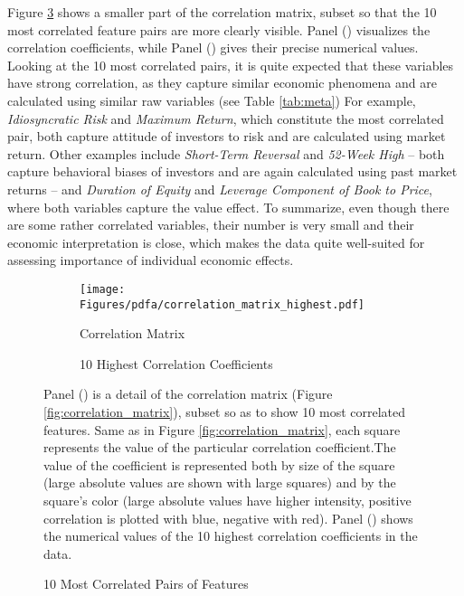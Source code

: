 		Figure \ref{fig:correlation_highest} shows a smaller part of the correlation matrix, subset so that the 10 most correlated feature pairs are more clearly visible. Panel () visualizes the correlation coefficients, while Panel () gives their precise numerical values. Looking at the 10 most correlated pairs, it is quite expected that these variables have strong correlation, as they capture similar economic phenomena and are calculated using similar raw variables (see Table \ref{tab:meta}) For example, \textit{Idiosyncratic Risk} and \textit{Maximum Return}, which constitute the most correlated pair, both capture attitude of investors to risk and are calculated using market return. Other examples include \textit{Short-Term Reversal} and \textit{52-Week High} -- both capture behavioral biases of investors and are again calculated using past market returns -- and \textit{Duration of Equity} and \textit{Leverage Component of Book to Price}, where both variables capture the value effect. To summarize, even though there are some rather correlated variables, their number is very small and their economic interpretation is close, which makes the data quite well-suited for assessing importance of individual economic effects. 
		\begin{figure}[!htb]	
			\centering		
			\begin{subfigure}[t]{\textwidth}
				\texttt{[image: Figures/pdfa/correlation\_matrix\_highest.pdf]}
				\caption{Correlation Matrix}
				\label{fig:correlation_matrix_highest}
			\end{subfigure}
			
			\begin{subfigure}[t]{\textwidth}
				\resizebox{\textwidth}{!}{}
				\caption{10 Highest Correlation Coefficients}
				\label{tab:most_correlated_pairs}
			\end{subfigure}
			\caption{10 Most Correlated Pairs of Features}
			\label{fig:correlation_highest}
			\medskip
			\small
			Panel () is a detail of the correlation matrix (Figure \ref{fig:correlation_matrix}), subset so as to show 10 most correlated features.  Same as in Figure \ref{fig:correlation_matrix}, each square represents the value of the particular correlation coefficient.The value of the coefficient is represented both by size of the square (large absolute values are shown with large squares) and by the square's color (large absolute values have higher intensity, positive correlation is plotted with blue, negative with red). Panel () shows the numerical values of the 10 highest correlation coefficients in the data. 
		\end{figure}
	
